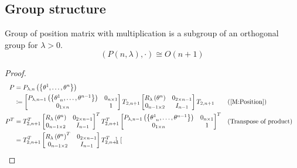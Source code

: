 \documentclass[../main.tex]{subfiles}
\begin{document}
\subsection{Group structure}
\begin{proposition}
Group of position matrix with multiplication is a subgroup of an orthogonal group for $\lambda>0$.
\begin{equation*}
\left(P\left(n,\lambda\right),\cdot\right)\cong O\left(n+1\right)
\end{equation*}
\end{proposition}
\begin{proof}
\begin{align*}
P&=P_{\lambda,n}\left(\left\{\tensor{\theta}{^1},\dots,\tensor{\theta}{^n}\right\}\right)\\
&\coloneqq
\begin{bmatrix}
P_{\lambda,n-1}\left(\left\{\tensor{\theta}{^1_{n}},\dots,\tensor{\theta}{^{n-1}}\right\}\right)&0_{n\times 1}\\
0_{1\times n}&1\\
\end{bmatrix}
T_{2,n+1}
\begin{bmatrix}
R_\lambda\left(\tensor{\theta}{^n}\right)&0_{{2}\times{n-1}}\\
0_{{n-1}\times{2}}&{I}_{n-1}\\
\end{bmatrix}
T_{2,n+1}
&&\text{(\cref{M:Position})}\\
P^T
&=
T_{2,n+1}^T
\begin{bmatrix}
R_\lambda\left(\tensor{\theta}{^n}\right)&0_{{2}\times{n-1}}\\
0_{{n-1}\times{2}}&{I}_{n-1}\\
\end{bmatrix}^T
T_{2,n+1}^T
\begin{bmatrix}
P_{\lambda,n-1}\left(\left\{\tensor{\theta}{^1_{n}},\dots,\tensor{\theta}{^{n-1}}\right\}\right)&0_{n\times 1}\\
0_{1\times n}&1\\
\end{bmatrix}^T
&&\text{(Transpose of product)}\\
&=
T_{2,n+1}^T
\begin{bmatrix}
R_\lambda\left(\tensor{\theta}{^n}\right)^T&0_{{2}\times{n-1}}\\
0_{{n-1}\times{2}}&{I}_{n-1}\\
\end{bmatrix}
T_{2,n+1}^T
\begin{bmatrix}

\end{bmatrix}
\end{align*}
\end{proof}
\end{document}
